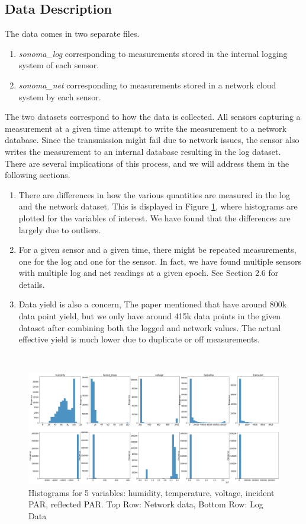 \documentclass[11pt, letterpaper]{article}
\begin{document}
\subsection{Data Description}
The data comes in two separate files.
\begin{enumerate}
    \item \textit{sonoma\_log} corresponding to measurements stored in the internal logging system of each sensor.
    \item \textit{sonoma\_net} corresponding to measurements stored in a network cloud system by each sensor.
\end{enumerate}
The two datasets correspond to how the data is collected. All sensors capturing a measurement at a given time attempt to write the measurement to a network database. Since the transmission might fail due to network issues, the sensor also writes the measurement to an internal database resulting in the log dataset. There are several implications of this process, and we will address them in the following sections.
\begin{enumerate}
    \item There are differences in how the various quantities are measured in the log and the network dataset. This is displayed in Figure \ref{fig1}, where histograms are plotted for the variables of interest. We have found that the differences are largely due to outliers.
    \item For a given sensor and a given time, there might be repeated measurements, one for the log and one for the sensor. In fact, we have found multiple sensors with multiple log and net readings at a given epoch. See Section 2.6 for details.
    \item Data yield is also a concern, The paper mentioned that have around 800k data point yield, but we only have around 415k data points in the given dataset after combining both the logged and network values. The actual effective yield is much lower due to duplicate or off measurements.
\end{enumerate} \\

\begin{figure}[!h]
\centering
\includegraphics[width=1.0\textwidth]{Report Images/Fig1.png}
\caption{Histograms for 5 variables: humidity, temperature, voltage, incident PAR, reflected PAR. Top Row: Network data, Bottom Row: Log Data}
\label{fig1}
\end{figure}
\end{document}
